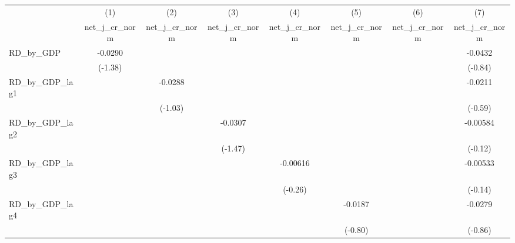 {
\def\sym#1{\ifmmode^{#1}\else\(^{#1}\)\fi}
\begin{tabular}{l*{7}{c}}
\toprule
          &\multicolumn{1}{c}{(1)}&\multicolumn{1}{c}{(2)}&\multicolumn{1}{c}{(3)}&\multicolumn{1}{c}{(4)}&\multicolumn{1}{c}{(5)}&\multicolumn{1}{c}{(6)}&\multicolumn{1}{c}{(7)}\\
          &\multicolumn{1}{c}{net\_j\_cr\_norm}&\multicolumn{1}{c}{net\_j\_cr\_norm}&\multicolumn{1}{c}{net\_j\_cr\_norm}&\multicolumn{1}{c}{net\_j\_cr\_norm}&\multicolumn{1}{c}{net\_j\_cr\_norm}&\multicolumn{1}{c}{net\_j\_cr\_norm}&\multicolumn{1}{c}{net\_j\_cr\_norm}\\
\midrule
RD\_by\_GDP &  -0.0290         &                  &                  &                  &                  &                  &  -0.0432         \\
          &  (-1.38)         &                  &                  &                  &                  &                  &  (-0.84)         \\
\addlinespace
RD\_by\_GDP\_lag1&                  &  -0.0288         &                  &                  &                  &                  &  -0.0211         \\
          &                  &  (-1.03)         &                  &                  &                  &                  &  (-0.59)         \\
\addlinespace
RD\_by\_GDP\_lag2&                  &                  &  -0.0307         &                  &                  &                  & -0.00584         \\
          &                  &                  &  (-1.47)         &                  &                  &                  &  (-0.12)         \\
\addlinespace
RD\_by\_GDP\_lag3&                  &                  &                  & -0.00616         &                  &                  & -0.00533         \\
          &                  &                  &                  &  (-0.26)         &                  &                  &  (-0.14)         \\
\addlinespace
RD\_by\_GDP\_lag4&                  &                  &                  &                  &  -0.0187         &                  &  -0.0279         \\
          &                  &                  &                  &                  &  (-0.80)         &                  &  (-0.86)         \\

\end{tabular}}
